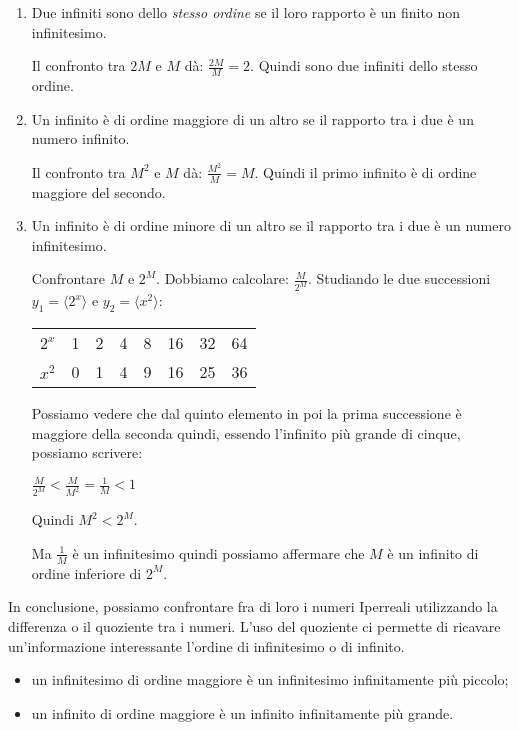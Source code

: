\begin{enumerate}
 \item Due infiniti sono dello \emph{stesso ordine} se il loro rapporto è un 
finito non infinitesimo.
\begin{esempio}
 Il confronto tra $2M$ e $M$ dà: $\frac{2M}{M} = 2$. Quindi sono due infiniti 
dello stesso ordine.
\end{esempio}
 \item Un infinito è di ordine maggiore di un altro se il rapporto tra i due 
è 
un numero infinito.
\begin{esempio}
 Il confronto tra $M^2$ e $M$ dà: $\frac{M^2}{M} = M$. Quindi il primo 
infinito 
è di ordine maggiore del secondo.
\end{esempio}
 \item Un infinito è di ordine minore di un altro se il rapporto tra i due è 
un numero infinitesimo.
\begin{esempio}
 Confrontare $M$ e $2^M$. Dobbiamo calcolare: $\frac{M}{2^M}$. 
Studiando le due successioni 
$y_1=\langle 2^x \rangle$ e $y_2=\langle x^2 \rangle$:
\begin{center}
\begin{tabular}{cccccccc}
$2^x$ & 1 & 2 & 4 & 8 & 16 & 32 & 64\\
$x^2$ & 0 & 1 & 4 & 9 & 16 & 25 & 36
\end{tabular}
\end{center}
Possiamo vedere che dal quinto elemento in poi la prima successione è 
maggiore 
della seconda quindi, essendo l'infinito più grande di cinque, possiamo 
scrivere:

$\frac{M}{2^M} < \frac{M}{M^2} = \frac{1}{M} < 1$

Quindi $M^2 < 2^M$.

Ma $\frac{1}{M}$ è un infinitesimo quindi possiamo affermare che $M$ è un 
infinito di ordine inferiore di $2^M$.
\end{esempio}
\end{enumerate}

In conclusione, possiamo confrontare fra di loro i numeri Iperreali 
utilizzando 
la differenza o il quoziente tra i numeri. L'uso del quoziente ci permette di 
ricavare un'informazione interessante l'ordine di infinitesimo o di infinito.
\begin{itemize} [noitemsep]
 \item un infinitesimo di ordine maggiore è un infinitesimo infinitamente più 
piccolo;
 \item un infinito di ordine maggiore è un infinito infinitamente più 
grande.
\end{itemize}

